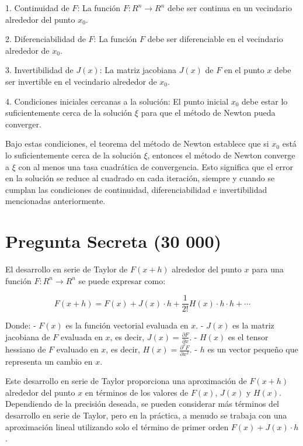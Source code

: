 \documentclass[a4paper,12pt]{article}
\begin{document}
1. Continuidad de \( F \): La función \( F : R^n \rightarrow R^n \) debe ser continua en un vecindario alrededor del punto \( x_0 \).

2. Diferenciabilidad de \( F \): La función \( F \) debe ser diferenciable en el vecindario alrededor de \( x_0 \).

3. Invertibilidad de \( J(x) \): La matriz jacobiana \( J(x) \) de \( F \) en el punto \( x \) debe ser invertible en el vecindario alrededor de \( x_0 \).

4. Condiciones iniciales cercanas a la solución: El punto inicial \( x_0 \) debe estar lo suficientemente cerca de la solución \( \xi \) para que el método de Newton pueda converger.

Bajo estas condiciones, el teorema del método de Newton establece que si \( x_0 \) está lo suficientemente cerca de la solución \( \xi \), entonces el método de Newton converge a \( \xi \) con al menos una tasa cuadrática de convergencia. Esto significa que el error en la solución se reduce al cuadrado en cada iteración, siempre y cuando se cumplan las condiciones de continuidad, diferenciabilidad e invertibilidad mencionadas anteriormente.


\section*{Pregunta Secreta (30 000)}
El desarrollo en serie de Taylor de \( F(x + h) \) alrededor del punto \( x \) para una función \( F : R^n \rightarrow R^n \) se puede expresar como:

\[ F(x + h) = F(x) + J(x) \cdot h + \frac{1}{2!} H(x) \cdot h \cdot h + \cdots \]

Donde:
- \( F(x) \) es la función vectorial evaluada en \( x \).
- \( J(x) \) es la matriz jacobiana de \( F \) evaluada en \( x \), es decir, \( J(x) = \frac{\partial F}{\partial x} \).
- \( H(x) \) es el tensor hessiano de \( F \) evaluado en \( x \), es decir, \( H(x) = \frac{\partial^2 F}{\partial x^2} \).
- \( h \) es un vector pequeño que representa un cambio en \( x \).

Este desarrollo en serie de Taylor proporciona una aproximación de \( F(x + h) \) alrededor del punto \( x \) en términos de los valores de \( F(x) \), \( J(x) \) y \( H(x) \). Dependiendo de la precisión deseada, se pueden considerar más términos del desarrollo en serie de Taylor, pero en la práctica, a menudo se trabaja con una aproximación lineal utilizando solo el término de primer orden \( F(x) + J(x) \cdot h \).
\end{document}
